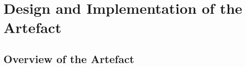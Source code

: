 \chapter{Design and Implementation of the Artefact} \label{cha:discussion}

\section{Overview of the Artefact}








